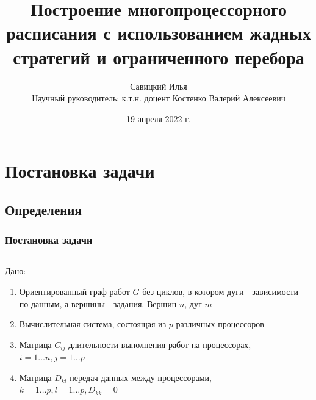 \documentclass[hyperref=unicode, aspectratio=169]{beamer}
\title{Построение многопроцессорного расписания с использованием жадных стратегий и ограниченного перебора}
\author{Савицкий Илья\\Научный руководитель: к.т.н. доцент Костенко Валерий Алексеевич}
\date{19 апреля 2022 г.}
\begin{document}
\begin{frame}
    \titlepage
\end{frame}

\begin{frame}
    \tableofcontents
\end{frame}

\section{Постановка задачи}
\subsection{Определения}

\begin{frame}
    \frametitle{Постановка задачи}
    \begin{columns}
        \begin{column}{0.6\textwidth}
            Дано:
            \begin{enumerate}
                \item Ориентированный граф работ $G$ без циклов, в котором дуги - зависимости по данным, а вершины - задания. Вершин $n$, дуг $m$
                \item Вычислительная система, состоящая из $p$ различных процессоров
                \item Матрица $C_{ij}$ длительности выполнения работ на процессорах, $i=1 \dots n, j=1 \dots p$
                \item Матрица $D_{kl}$ передач данных между процессорами, $k=1 \dots p, l = 1 \dots p, D_{kk} = 0$
            \end{enumerate}
        \end{column}
        \begin{column}{0.4\textwidth}
        \end{column}
    \end{columns}
\end{frame}
\end{document}
